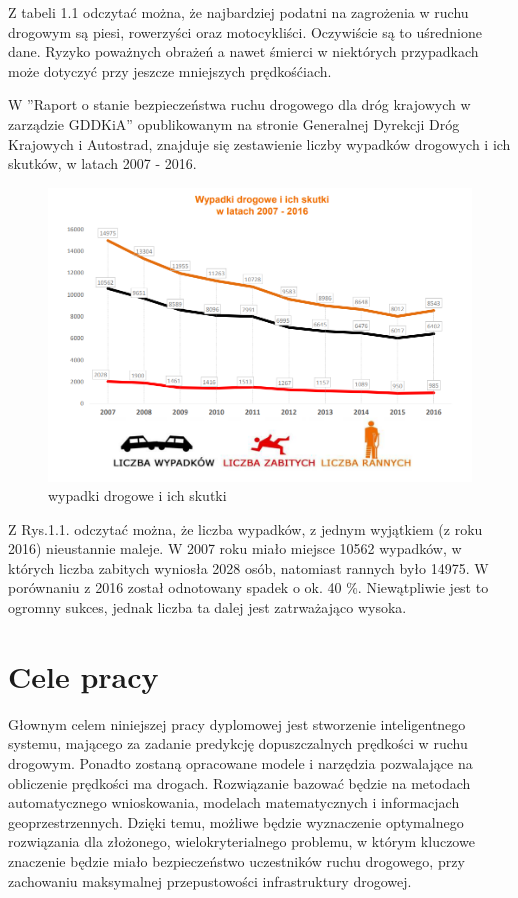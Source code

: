 Z tabeli 1.1 odczytać można, że najbardziej podatni na zagrożenia w ruchu drogowym są piesi, rowerzyści oraz motocykliści.  Oczywiście są to uśrednione dane. Ryzyko poważnych obrażeń a nawet śmierci w niektórych przypadkach może dotyczyć przy jeszcze mniejszych prędkośćiach.

\newpage


W ''Raport o stanie bezpieczeństwa ruchu drogowego dla dróg krajowych w zarządzie GDDKiA'' opublikowanym na stronie Generalnej Dyrekcji Dróg Krajowych i Autostrad, znajduje się zestawienie liczby wypadków drogowych i ich skutków, w latach 2007 - 2016.

\begin{figure}[h]
\caption{wypadki drogowe i ich skutki}
\centering
\includegraphics[width=1\textwidth]{picture1}
\end{figure}

Z Rys.1.1. odczytać można, że liczba wypadków, z jednym wyjątkiem (z roku 2016) nieustannie maleje. W 2007 roku miało miejsce 10562 wypadków, w których liczba zabitych wyniosła 2028 osób, natomiast rannych było 14975. W porównaniu z 2016 został odnotowany spadek o ok. 40 \%. Niewątpliwie jest to ogromny sukces, jednak liczba ta dalej jest zatrważająco wysoka. 

\newpage
\section{Cele pracy}
\label{sec:celePracy}

Głownym celem niniejszej pracy dyplomowej jest stworzenie inteligentnego systemu, mającego za zadanie predykcję dopuszczalnych prędkości w ruchu drogowym. Ponadto zostaną opracowane modele i narzędzia pozwalające na obliczenie prędkości ma drogach. Rozwiązanie bazować będzie na metodach automatycznego wnioskowania, modelach matematycznych i informacjach geoprzestrzennych. Dzięki temu, możliwe będzie wyznaczenie optymalnego rozwiązania dla złożonego, wielokryterialnego problemu, w którym kluczowe znaczenie będzie miało bezpieczeństwo uczestników ruchu drogowego, przy zachowaniu maksymalnej przepustowości infrastruktury drogowej.

